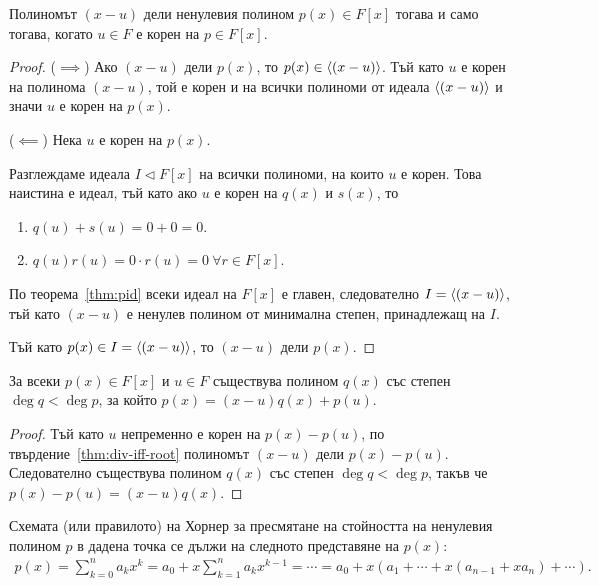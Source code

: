 \documentclass[numbers=endperiod, bibliography=totocnumbered]{scrartcl}
\begin{document}
\begin{proposition}\label{thm:div-iff-root}
  Полиномът \( (x - u) \) дели ненулевия полином \( p(x) \in F[x] \) тогава и само тогава, когато \( u \in F \) е корен на \( p \in F[x] \).
\end{proposition}
\begin{proof}
  (\( \implies \)) Ако \( (x - u) \) дели \( p(x) \), то \( p(x) \in \left\langle (x - u) \right\rangle \). Тъй като \( u \) е корен на полинома \( (x - u) \), той е корен и на всички полиноми от идеала \( \left\langle (x - u) \right\rangle \) и значи \( u \) е корен на \( p(x) \).

  (\( \impliedby \)) Нека \( u \) е корен на \( p(x) \).

  Разглеждаме идеала \( I \lhd F[x] \) на всички полиноми, на които \( u \) е корен. Това наистина е идеал, тъй като ако \( u \) е корен на \( q(x) \) и \( s(x) \), то
  \begin{enumerate}
    \item \( q(u) + s(u) = 0 + 0 = 0 \).
    \item \( q(u) r(u) = 0 \cdot r(u) = 0~\forall r \in F[x] \).
  \end{enumerate}

  По теорема~\ref{thm:pid} всеки идеал на \( F[x] \) е главен, следователно \( I = \left\langle (x - u) \right\rangle \), тъй като \( (x - u) \) е ненулев полином от минимална степен, принадлежащ на \( I \).

  Тъй като \( p(x) \in I = \left\langle (x - u) \right\rangle \), то \( (x - u) \) дели \( p(x) \).
\end{proof}

\begin{proposition}\label{thm:gen-div-iff-root}
  За всеки \( p(x) \in F[x] \) и \( u \in F \) съществува полином \( q(x) \) със степен \( \deg q < \deg p \), за който \( p(x) = (x - u) q(x) + p(u) \).
\end{proposition}
\begin{proof}
  Тъй като \( u \) непременно е корен на \( p(x) - p(u) \), по твърдение~\ref{thm:div-iff-root} полиномът \( (x - u) \) дели \( p(x) - p(u) \). Следователно съществува полином \( q(x) \) със степен \( \deg q < \deg p \), такъв че \( p(x) - p(u) = (x - u) q(x) \).
\end{proof}

Схемата (или правилото) на Хорнер за пресмятане на стойността на ненулевия полином \( p \) в дадена точка се дължи на следното представяне на \( p(x) \):
\begin{align*}
  p(x) = \sum_{k=0}^n a_k x^k = a_0 + x \sum_{k=1}^n a_k x^{k-1} = \cdots = a_0 + x (a_1 + \cdots + x(a_{n-1} + x a_n) + \cdots).
\end{align*}
\end{document}
